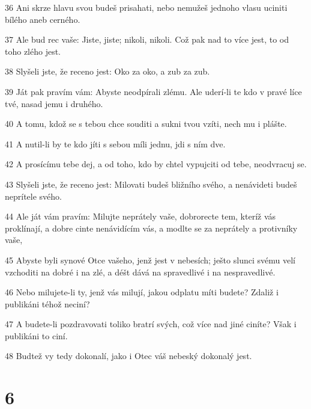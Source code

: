 \par 36 Ani skrze hlavu svou budeš prisahati, nebo nemužeš jednoho vlasu uciniti bílého aneb cerného.
\par 37 Ale bud rec vaše: Jiste, jiste; nikoli, nikoli. Což pak nad to více jest, to od toho zlého jest.
\par 38 Slyšeli jste, že receno jest: Oko za oko, a zub za zub.
\par 39 Ját pak pravím vám: Abyste neodpírali zlému. Ale uderí-li te kdo v pravé líce tvé, nasad jemu i druhého.
\par 40 A tomu, kdož se s tebou chce souditi a sukni tvou vzíti, nech mu i plášte.
\par 41 A nutil-li by te kdo jíti s sebou míli jednu, jdi s ním dve.
\par 42 A prosícímu tebe dej, a od toho, kdo by chtel vypujciti od tebe, neodvracuj se.
\par 43 Slyšeli jste, že receno jest: Milovati budeš bližního svého, a nenávideti budeš neprítele svého.
\par 44 Ale ját vám pravím: Milujte neprátely vaše, dobrorecte tem, kteríž vás proklínají, a dobre cinte nenávidícím vás, a modlte se za neprátely a protivníky vaše,
\par 45 Abyste byli synové Otce vašeho, jenž jest v nebesích; ješto slunci svému velí vzchoditi na dobré i na zlé, a déšt dává na spravedlivé i na nespravedlivé.
\par 46 Nebo milujete-li ty, jenž vás milují, jakou odplatu míti budete? Zdaliž i publikáni téhož neciní?
\par 47 A budete-li pozdravovati toliko bratrí svých, což více nad jiné ciníte? Však i publikáni to ciní.
\par 48 Budtež vy tedy dokonalí, jako i Otec váš nebeský dokonalý jest.

\chapter{6}

